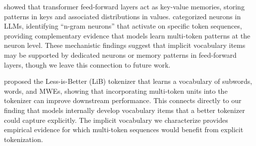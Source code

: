 \citet{geva2020transformer} showed that transformer feed-forward layers act as key-value memories, storing patterns in keys and associated distributions in values.
\citet{voita2023neurons} categorized neurons in LLMs, identifying ``n-gram neurons'' that activate on specific token sequences, providing complementary evidence that models learn multi-token patterns at the neuron level.
These mechanistic findings suggest that implicit vocabulary items may be supported by dedicated neurons or memory patterns in feed-forward layers, though we leave this connection to future work.

\citet{yang2024rethinking} proposed the Less-is-Better (LiB) tokenizer that learns a vocabulary of subwords, words, and MWEs, showing that incorporating multi-token units into the tokenizer can improve downstream performance.
This connects directly to our finding that models internally develop vocabulary items that a better tokenizer could capture explicitly.
The implicit vocabulary we characterize provides empirical evidence for which multi-token sequences would benefit from explicit tokenization.
